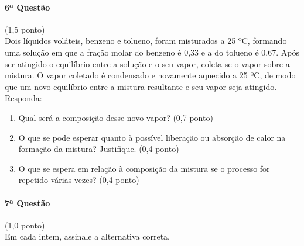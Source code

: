 \documentclass[12pt,a4paper]{article}
\begin{document}
\paragraph{6ª Questão} (1,5 ponto)\\
Dois líquidos voláteis, benzeno e tolueno, foram misturados a 25 ºC, formando uma solução em que a fração molar do benzeno é 0,33 e a do tolueno é 0,67. Após ser atingido o equilíbrio entre a solução e o seu vapor, coleta-se o vapor sobre a mistura. O vapor coletado é condensado e novamente aquecido a 25 ºC, de modo que um novo equilíbrio entre a mistura resultante e seu vapor seja atingido. Responda:
\begin{enumerate}[label=(\roman*)]
\item Qual será a composição desse novo vapor? \hfill (0,7 ponto)
\item O que se pode esperar quanto à possível liberação ou absorção de calor na formação da mistura? Justifique. \hfill (0,4 ponto)
\item O que se espera em relação à composição da mistura se o processo for repetido várias vezes? \hfill (0,4 ponto)
\end{enumerate}

\paragraph{7ª Questão} (1,0 ponto)\\
Em cada intem, assinale a alternativa correta.
\end{document}
